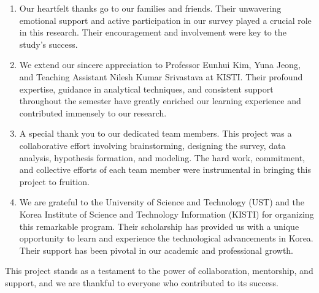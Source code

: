 \documentclass[conference]{IEEEtran}
\begin{document}
\begin{enumerate}
    \item Our heartfelt thanks go to our families and friends. Their unwavering emotional support and active participation in our survey played a crucial role in this research. Their encouragement and involvement were key to the study's success.
    
    \item We extend our sincere appreciation to Professor Eunhui Kim, Yuna Jeong, and Teaching Assistant Nilesh Kumar Srivastava at KISTI. Their profound expertise, guidance in analytical techniques, and consistent support throughout the semester have greatly enriched our learning experience and contributed immensely to our research.
    
    \item A special thank you to our dedicated team members. This project was a collaborative effort involving brainstorming, designing the survey, data analysis, hypothesis formation, and modeling. The hard work, commitment, and collective efforts of each team member were instrumental in bringing this project to fruition.
    
    \item We are grateful to the University of Science and Technology (UST) and the Korea Institute of Science and Technology Information (KISTI) for organizing this remarkable program. Their scholarship has provided us with a unique opportunity to learn and experience the technological advancements in Korea. Their support has been pivotal in our academic and professional growth.
\end{enumerate}

This project stands as a testament to the power of collaboration, mentorship, and support, and we are thankful to everyone who contributed to its success.



\end{document}
